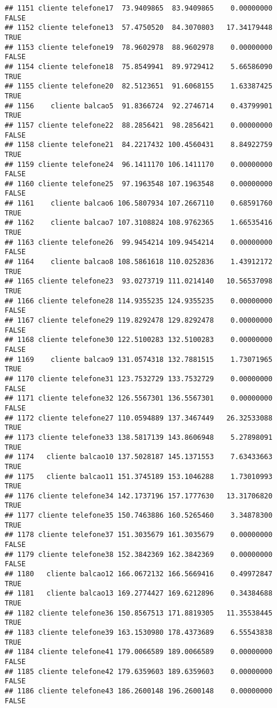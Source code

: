 \documentclass[
]{article}
\begin{document}
\begin{verbatim}
## 1151 cliente telefone17  73.9409865  83.9409865    0.00000000    FALSE
## 1152 cliente telefone13  57.4750520  84.3070803   17.34179448     TRUE
## 1153 cliente telefone19  78.9602978  88.9602978    0.00000000    FALSE
## 1154 cliente telefone18  75.8549941  89.9729412    5.66586090     TRUE
## 1155 cliente telefone20  82.5123651  91.6068155    1.63387425     TRUE
## 1156    cliente balcao5  91.8366724  92.2746714    0.43799901     TRUE
## 1157 cliente telefone22  88.2856421  98.2856421    0.00000000    FALSE
## 1158 cliente telefone21  84.2217432 100.4560431    8.84922759     TRUE
## 1159 cliente telefone24  96.1411170 106.1411170    0.00000000    FALSE
## 1160 cliente telefone25  97.1963548 107.1963548    0.00000000    FALSE
## 1161    cliente balcao6 106.5807934 107.2667110    0.68591760     TRUE
## 1162    cliente balcao7 107.3108824 108.9762365    1.66535416     TRUE
## 1163 cliente telefone26  99.9454214 109.9454214    0.00000000    FALSE
## 1164    cliente balcao8 108.5861618 110.0252836    1.43912172     TRUE
## 1165 cliente telefone23  93.0273719 111.0214140   10.56537098     TRUE
## 1166 cliente telefone28 114.9355235 124.9355235    0.00000000    FALSE
## 1167 cliente telefone29 119.8292478 129.8292478    0.00000000    FALSE
## 1168 cliente telefone30 122.5100283 132.5100283    0.00000000    FALSE
## 1169    cliente balcao9 131.0574318 132.7881515    1.73071965     TRUE
## 1170 cliente telefone31 123.7532729 133.7532729    0.00000000    FALSE
## 1171 cliente telefone32 126.5567301 136.5567301    0.00000000    FALSE
## 1172 cliente telefone27 110.0594889 137.3467449   26.32533088     TRUE
## 1173 cliente telefone33 138.5817139 143.8606948    5.27898091     TRUE
## 1174   cliente balcao10 137.5028187 145.1371553    7.63433663     TRUE
## 1175   cliente balcao11 151.3745189 153.1046288    1.73010993     TRUE
## 1176 cliente telefone34 142.1737196 157.1777630   13.31706820     TRUE
## 1177 cliente telefone35 150.7463886 160.5265460    3.34878300     TRUE
## 1178 cliente telefone37 151.3035679 161.3035679    0.00000000    FALSE
## 1179 cliente telefone38 152.3842369 162.3842369    0.00000000    FALSE
## 1180   cliente balcao12 166.0672132 166.5669416    0.49972847     TRUE
## 1181   cliente balcao13 169.2774427 169.6212896    0.34384688     TRUE
## 1182 cliente telefone36 150.8567513 171.8819305   11.35538445     TRUE
## 1183 cliente telefone39 163.1530980 178.4373689    6.55543838     TRUE
## 1184 cliente telefone41 179.0066589 189.0066589    0.00000000    FALSE
## 1185 cliente telefone42 179.6359603 189.6359603    0.00000000    FALSE
## 1186 cliente telefone43 186.2600148 196.2600148    0.00000000    FALSE

\end{verbatim}
\end{document}
